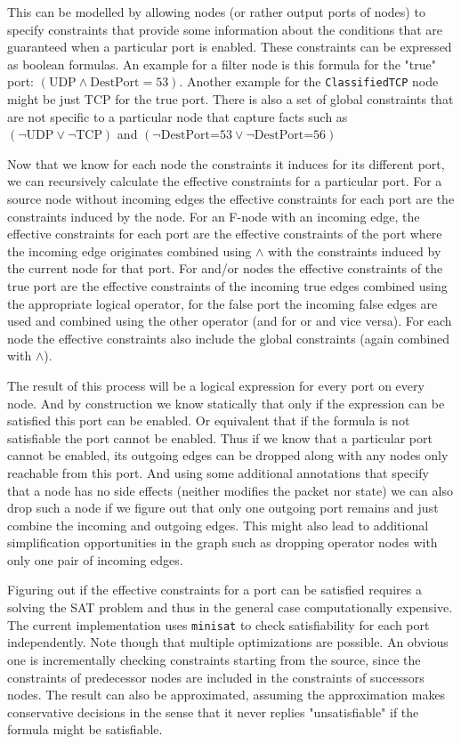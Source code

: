 \documentclass[a4paper]{article}
\begin{document}
This can be modelled by allowing nodes (or rather output ports of nodes) to
specify constraints that provide some information about the conditions that are
guaranteed when a particular port is enabled. These constraints can be expressed
as boolean formulas. An example for a filter node is this formula for the "true"
port: $(\text{UDP} \land \text{DestPort}=53)$. Another example for the
\texttt{ClassifiedTCP} node might be just TCP for the true port. There is also a
set of global constraints that are not specific to a particular node that
capture facts such as $(\lnot\text{UDP}\lor\lnot\text{TCP})$ and
$(\lnot\text{DestPort=53}\lor\lnot\text{DestPort=56})$

Now that we know for each node the constraints it induces for its different
port, we can recursively calculate the effective constraints for a particular
port. For a source node without incoming edges the effective constraints for
each port are the constraints induced by the node. For an F-node with an
incoming edge, the effective constraints for each port are the effective
constraints of the port where the incoming edge originates combined using
$\land$ with the constraints induced by the current node for that port. For
and/or nodes the effective constraints of the true port are the effective
constraints of the incoming true edges combined using the appropriate logical
operator, for the false port the incoming false edges are used and combined
using the other operator (and for or and vice versa). For each node the
effective constraints also include the global constraints (again combined with
$\land$).

The result of this process will be a logical expression for every port on every
node. And by construction we know statically that only if the expression can be
satisfied this port can be enabled. Or equivalent that if the formula is not
satisfiable the port cannot be enabled. Thus if we know that a particular port
cannot be enabled, its outgoing edges can be dropped along with any nodes
only reachable from this port. And using some additional annotations that
specify that a node has no side effects (neither modifies the packet nor state)
we can also drop such a node if we figure out that only one outgoing port
remains and just combine the incoming and outgoing edges. This might also lead
to additional simplification opportunities in the graph such as dropping
operator nodes with only one pair of incoming edges.

Figuring out if the effective constraints for a port can be satisfied requires a
solving the SAT problem and thus in the general case computationally expensive.
The current implementation uses \texttt{minisat} to check satisfiability for
each port independently. Note though that multiple optimizations are possible.
An obvious one is incrementally checking constraints starting from the source,
since the constraints of predecessor nodes are included in the constraints of
successors nodes. The result can also be approximated, assuming the
approximation makes conservative decisions in the sense that it never replies
"unsatisfiable" if the formula might be satisfiable.
\end{document}
